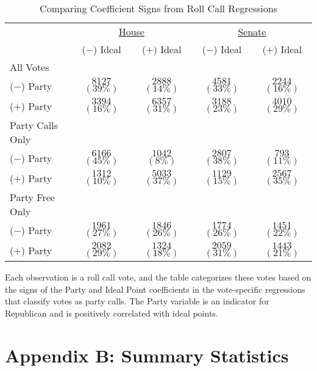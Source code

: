 \documentclass[12pt]{article}
\begin{document}
\begin{table}[!htbp]
\centering
\begin{threeparttable}
\singlespacing
\caption{Comparing Coefficient Signs from Roll Call Regressions}
\label{tab-sorting}
\begin{tabular}{l cc|cc}
\hline
&\multicolumn{2}{c}{\underline{House}}&\multicolumn{2}{c}{\underline{Senate}}\\
& ($-$) Ideal & ($+$) Ideal & ($-$) Ideal & ($+$) Ideal \\
\hline
All Votes \\
\hline
($-$) Party & $8127$ $(39\%)$& $2888$ $(14\%)$& $4581$ $(33\%)$& $2244$ $(16\%)$\\
($+$) Party & $3394$ $(16\%)$& $6357$ $(31\%)$& $3188$ $(23\%)$& $4010$ $(29\%)$\\
\hline
Party Calls Only\\
\hline
($-$) Party & $6166$ $(45\%)$& $1042$ $( 8\%)$& $2807$ $(38\%)$& $793$ $(11\%)$\\
($+$) Party & $1312$ $(10\%)$& $5033$ $(37\%)$& $1129$ $(15\%)$& $2567$ $(35\%)$\\
\hline
Party Free Only\\
\hline
($-$) Party & $1961$ $(27\%)$& $1846$ $(26\%)$& $1774$ $(26\%)$& $1451$ $(22\%)$\\
($+$) Party & $2082$ $(29\%)$& $1324$ $(18\%)$& $2059$ $(31\%)$& $1443$ $(21\%)$\\
\hline
\end{tabular}
\begin{tablenotes}
   \item
   Each observation is a roll call vote, and the table categorizes these votes
   based on the signs of the Party and Ideal Point coefficients
   in the vote-specific regressions that classify votes as party calls.
   The Party variable is an indicator for Republican and is positively
   correlated with ideal points.
 \end{tablenotes}
\end{threeparttable}
\end{table}

\clearpage


\section*{Appendix B: Summary Statistics}
%
\end{document}
